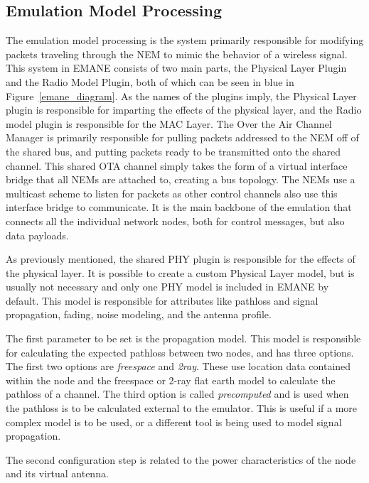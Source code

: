 \subsection{Emulation Model Processing}
The emulation model processing is the system primarily responsible for modifying packets traveling through the NEM to mimic the behavior of a wireless signal.
This system in EMANE consists of two main parts, the Physical Layer Plugin and the Radio Model Plugin, both of which can be seen in blue in Figure~\ref{emane_diagram}.
As the names of the plugins imply, the Physical Layer plugin is responsible for imparting the effects of the physical layer, and the Radio model plugin is responsible for the MAC Layer.
The Over the Air Channel Manager is primarily responsible for pulling packets addressed to the NEM off of the shared bus, and putting packets ready to be transmitted onto the shared channel.
This shared OTA channel simply takes the form of a virtual interface bridge that all NEMs are attached to, creating a bus topology.
The NEMs use a multicast scheme to listen for packets as other control channels also use this interface bridge to communicate.
It is the main backbone of the emulation that connects all the individual network nodes, both for control messages, but also data payloads.\par
As previously mentioned, the shared PHY plugin is responsible for the effects of the physical layer.
It is possible to create a custom Physical Layer model, but is usually not necessary and only one PHY model is included in EMANE by default.
This model is responsible for attributes like pathloss and signal propagation, fading, noise modeling, and the antenna profile.\par
The first parameter to be set is the propagation model.
This model is responsible for calculating the expected pathloss between two nodes, and has three options.
The first two options are \textit{freespace} and \textit{2ray}.
These use location data contained within the node and the freespace or 2-ray flat earth model to calculate the pathloss of a channel.
The third option is called \textit{precomputed} and is used when the pathloss is to be calculated external to the emulator.
This is useful if a more complex model is to be used, or a different tool is being used to model signal propagation.\par
The second configuration step is related to the power characteristics of the node and its virtual antenna.

